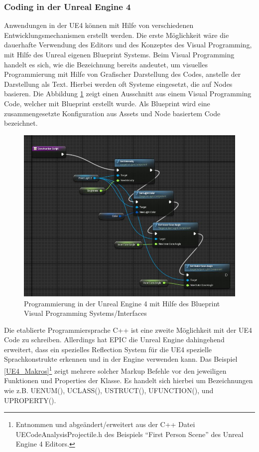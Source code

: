 \documentclass[pagesize, paper=a4, fontsize=12pt, titlepage=true, headings=small, headnosepline, abstractoff, liststotoc, nochapterprefix, plainheadsepline, twoside]{scrreprt}
\begin{document}
\subsubsection{Coding in der Unreal Engine 4}
Anwendungen in der UE4 können mit Hilfe von verschiedenen Entwicklungsmechanismen erstellt werden. Die erste Möglichkeit wäre die dauerhafte Verwendung des Editors und des Konzeptes des Visual Programming, mit Hilfe des Unreal eigenen Blueprint Systems. Beim Visual Programming handelt es sich, wie die Bezeichnung bereits andeutet, um visuelles Programmierung mit Hilfe von Grafischer Darstellung des Codes, anstelle der Darstellung als Text. Hierbei werden oft Systeme eingesetzt, die auf Nodes basieren. Die Abbildung \ref{UE4Blueprint} zeigt einen Ausschnitt aus einem Visual Programming Code, welcher mit Blueprint erstellt wurde. Als Blueprint wird eine zusammengesetzte Konfiguration aus Assets und Node basiertem Code bezeichnet.

\begin{figure}[ht]
	\centering
	\includegraphics[width=\linewidth]{Bilder/ue4Blueprint.jpg}
	\caption{Programmierung in der Unreal Engine 4 mit Hilfe des Blueprint Visual Programming Systems/Interfaces}
	\label{UE4Blueprint}	
\end{figure} 

Die etablierte Programmiersprache C++ ist eine zweite Möglichkeit mit der UE4 Code zu schreiben. Allerdings hat EPIC die Unreal Engine  dahingehend erweitert, dass ein spezielles Reflection System für die UE4 spezielle Sprachkonstrukte erkennen und in der Engine verwenden kann. Das Beispiel \ref{UE4_Makros}\footnote{Entnommen und abgeändert/erweitert aus der C++ Datei UECodeAnalysisProjectile.h des Beispiels “First Person Scene” des Unreal Engine 4 Editors.} zeigt mehrere solcher Markup Befehle vor den jeweiligen Funktionen und Properties der Klasse. Es handelt sich hierbei um Bezeichnungen wie z.B. UENUM(), UCLASS(), USTRUCT(), UFUNCTION(), und UPROPERTY().
\end{document}
